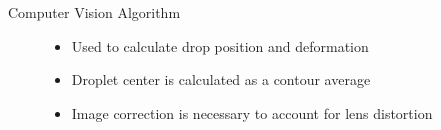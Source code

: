 \documentclass[final]{beamer}
\newlength{\colwidth}
\begin{document}
\begin{frame}[t]
\begin{columns}[t]
\begin{column}{\colwidth}
\begin{block}{Computer Vision Algorithm}
    \begin{figure}[htbp]
        \centering
        \begin{minipage}{0.45\textwidth}
            \centering
        \end{minipage}
        \hfill
        \begin{minipage}{0.45\textwidth}
            \begin{itemize}
            \item Used to calculate drop position and deformation
            \item Droplet center is calculated as a contour average
            \item Image correction is necessary to account for lens distortion \cite*{zhang_flexible_2000}
            \end{itemize}
        \end{minipage}
        \\
        \begin{minipage}{0.45\textwidth}
            \centering


\end{minipage}
\end{figure}
\end{block}
\end{column}
\end{columns}
\end{frame}
\end{document}
